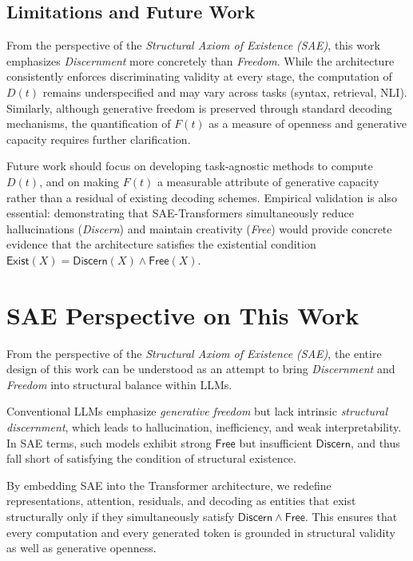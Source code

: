 \documentclass[11pt]{article}
\theoremstyle{plain}
\theoremstyle{definition}
\theoremstyle{remark}
\begin{document}
\subsection*{Limitations and Future Work}

From the perspective of the \emph{Structural Axiom of Existence (SAE)}, this work emphasizes 
\emph{Discernment} more concretely than \emph{Freedom}. While the architecture consistently enforces 
discriminating validity at every stage, the computation of $D(t)$ remains underspecified and may vary 
across tasks (syntax, retrieval, NLI). Similarly, although generative freedom is preserved through 
standard decoding mechanisms, the quantification of $F(t)$ as a measure of openness and generative 
capacity requires further clarification. 

Future work should focus on developing task-agnostic methods to compute $D(t)$, and on making $F(t)$ 
a measurable attribute of generative capacity rather than a residual of existing decoding schemes. 
Empirical validation is also essential: demonstrating that SAE-Transformers simultaneously reduce 
hallucinations (\emph{Discern}) and maintain creativity (\emph{Free}) would provide concrete evidence 
that the architecture satisfies the existential condition $\mathsf{Exist}(X) = \mathsf{Discern}(X) 
\wedge \mathsf{Free}(X)$. 

\section{SAE Perspective on This Work}

From the perspective of the \emph{Structural Axiom of Existence (SAE)}, the entire design of this work can be understood as an attempt to bring \emph{Discernment} and \emph{Freedom} into structural balance within LLMs.

Conventional LLMs emphasize \emph{generative freedom} but lack intrinsic \emph{structural discernment}, which leads to hallucination, inefficiency, and weak interpretability. In SAE terms, such models exhibit strong $\mathsf{Free}$ but insufficient $\mathsf{Discern}$, and thus fall short of satisfying the condition of structural existence.

By embedding SAE into the Transformer architecture, we redefine representations, attention, residuals, and decoding as entities that exist structurally only if they simultaneously satisfy $\mathsf{Discern} \wedge \mathsf{Free}$. This ensures that every computation and every generated token is grounded in structural validity as well as generative openness.
\end{document}
